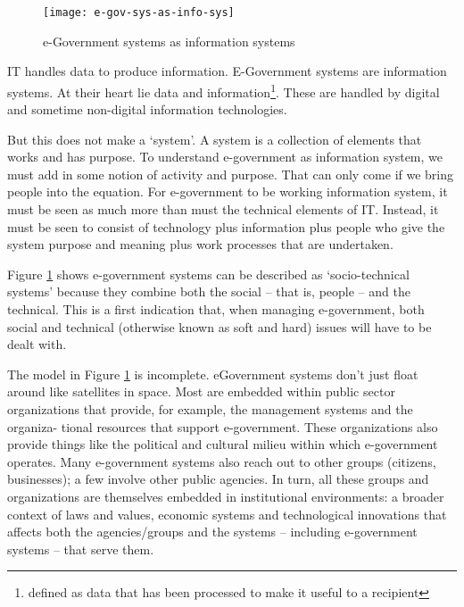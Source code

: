 \begin{figure}[hb!]
	\centering
	\texttt{[image: e-gov-sys-as-info-sys]}
	\caption[e-Government systems as information systems]{e-Government systems as information systems}
	\label{fig:e-gov-sys-as-info-sys}
\end{figure}


IT handles data to produce information. E-Government systems are information systems. At their heart lie data and information\footnote{defined as data that has been processed to make it useful to a recipient}. These are handled by digital and sometime non-digital information technologies.

But this does not make a `system'. A system is a collection of elements that works and has purpose. To understand e-government as information system, we must add in some notion of activity and purpose. That can only come if we bring people into the equation. For e-government to be working information system, it must be seen as much more than must the technical elements of IT. Instead, it must be seen to consist of technology plus information plus people who give the system purpose and meaning plus work processes that are undertaken.

Figure {\ref{fig:e-gov-sys-as-info-sys}} shows e-government systems can be described as ‘socio-technical systems’ because they combine both the social – that is, people – and the technical. This is a first indication that, when managing e-government, both social and technical (otherwise known as soft and hard) issues will have to be dealt with.



The model in Figure \ref{fig:e-gov-sys-as-info-sys} is incomplete. eGovernment systems
don’t just float around like satellites in space. Most are embedded within public
sector organizations that provide, for example,
the management systems and the organiza-
tional resources that support e-government.
These organizations also provide things
like the political and cultural milieu
within which e-government operates. Many
e-government systems also reach out to
other groups (citizens, businesses); a few
involve other public agencies. In turn, all
these groups and organizations are themselves embedded in institutional environments: a broader context of laws and values,
economic systems and technological innovations that affects both the agencies/groups
and the systems – including e-government
systems – that serve them.

